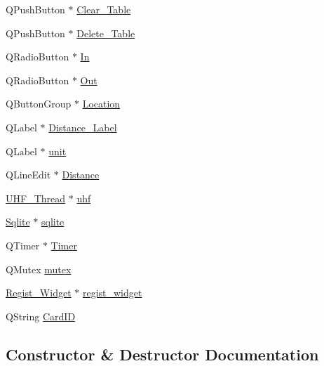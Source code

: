 \begin{DoxyCompactItemize}
Q\+Push\+Button $\ast$ \mbox{\hyperlink{class_widget_aa3cade7629649f1512fa424cb020defb}{Clear\+\_\+\+Table}}
\item 
Q\+Push\+Button $\ast$ \mbox{\hyperlink{class_widget_a65f7dd306b607bddc8943ddb73da7e6a}{Delete\+\_\+\+Table}}
\item 
Q\+Radio\+Button $\ast$ \mbox{\hyperlink{class_widget_ac87625beee79541777072c31c1b90440}{In}}
\item 
Q\+Radio\+Button $\ast$ \mbox{\hyperlink{class_widget_a898d0d488cbb3375178c9f32f27fa381}{Out}}
\item 
Q\+Button\+Group $\ast$ \mbox{\hyperlink{class_widget_a6ad1659a8c137e3b42eca21dc30bba2c}{Location}}
\item 
Q\+Label $\ast$ \mbox{\hyperlink{class_widget_a6ac38bd9f751e25d666254e9c620d8cf}{Distance\+\_\+\+Label}}
\item 
Q\+Label $\ast$ \mbox{\hyperlink{class_widget_a147ff0275f5ebb2d20f198228e150b81}{unit}}
\item 
Q\+Line\+Edit $\ast$ \mbox{\hyperlink{class_widget_aae385191a598a62e56d8c9ec05e7cd57}{Distance}}
\item 
\mbox{\hyperlink{class_u_h_f___thread}{U\+H\+F\+\_\+\+Thread}} $\ast$ \mbox{\hyperlink{class_widget_ae73de6c68cde3ec8fe6954c51407f57f}{uhf}}
\item 
\mbox{\hyperlink{class_sqlite}{Sqlite}} $\ast$ \mbox{\hyperlink{class_widget_ad8f43e1f44b633c0ee7a6fff804992ad}{sqlite}}
\item 
Q\+Timer $\ast$ \mbox{\hyperlink{class_widget_a4b0d7ecee82e854a93d5950e026414ee}{Timer}}
\item 
Q\+Mutex \mbox{\hyperlink{class_widget_ac4d8f49e18cd92ac569495773d447709}{mutex}}
\item 
\mbox{\hyperlink{class_regist___widget}{Regist\+\_\+\+Widget}} $\ast$ \mbox{\hyperlink{class_widget_af45047dfe0104896361c55e4b8bebbe2}{regist\+\_\+widget}}
\item 
Q\+String \mbox{\hyperlink{class_widget_aba2c65627eca33b72eca29bc6d74f5f8}{Card\+ID}}
\end{DoxyCompactItemize}


\subsection{Constructor \& Destructor Documentation}
\mbox{\label{class_widget_a29531c7f141e461322981b3b579d4590}} 
